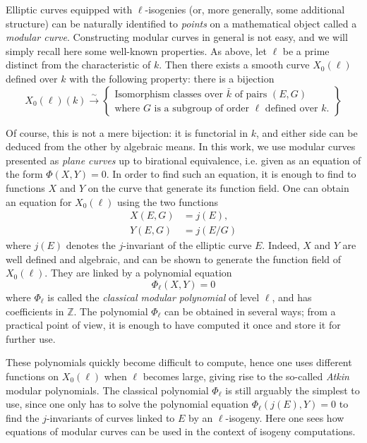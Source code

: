 \documentclass{article}
\newcommand{\Z}{\mathbb{Z}}
\newcommand{\isom}{\overset{\sim}{\longrightarrow}}
\newcommand{\set}[1]{\left\{#1\right\}}
\theoremstyle{definition}
\begin{document}
Elliptic curves equipped with $\ell$-isogenies (or, more generally, some 
additional structure) can be naturally identified to \emph{points} on a 
mathematical object called a \emph{modular curve}. Constructing modular curves 
in general is not easy, and we will simply recall here some well-known 
properties. As above, let $\ell$ be a prime distinct from the characteristic of 
$k$. 
Then there exists a smooth curve $X_0(\ell)$ defined over $k$ with the 
following property: there is a bijection
\[
X_0(\ell)(k) \isom \set{
\begin{matrix}
\text{Isomorphism classes over $\bar{k}$ of pairs $(E, G)$}\\
\text{where $G$ is a subgroup of order $\ell$ defined over $k$.}
\end{matrix}
}
\]

Of course, this is not a mere bijection: it is functorial in $k$, and either
side can be deduced from the other by algebraic means.
In this work, we use modular curves presented as \emph{plane curves} up to 
birational equivalence, i.e. given as an equation of the form
$\Phi(X, Y) = 0.$
In order to find such an equation, it is enough to find to functions $X$ and $Y$
 on the curve that generate its function field. One can obtain an equation for $
X_0(\ell)$ using the two functions
\[
\begin{aligned}
X(E, G) &= j(E), \\
Y(E, G) &= j(E/G)
\end{aligned}
\]
where $j(E)$ denotes the $j$-invariant of the elliptic curve $E$. Indeed, $X$ 
and $Y$ are well defined and algebraic, and can be shown to generate the 
function field of $X_0(\ell)$. They are linked by a polynomial equation
\[
\Phi_\ell(X, Y) = 0
\]
where $\Phi_\ell$ is called the \emph{classical modular polynomial} of level $
\ell$, and has coefficients in $\Z$. The polynomial $\Phi_\ell$ can be
obtained in several ways; from a practical point of view, it is enough to have
computed it once and store it for further use.

These polynomials quickly become difficult to compute, hence one uses different 
functions on $X_0(\ell)$ when $\ell$ becomes large, giving rise to the 
so-called \emph{Atkin} modular polynomials. The classical polynomial $\Phi_\ell$ 
is still arguably the simplest to use, since one only has to solve the 
polynomial equation $\Phi_\ell(j(E), Y) = 0$ to find the $j$-invariants of 
curves linked to $E$ by an $\ell$-isogeny. Here one sees how equations of 
modular curves can be used in the context of isogeny computations.
\end{document}
